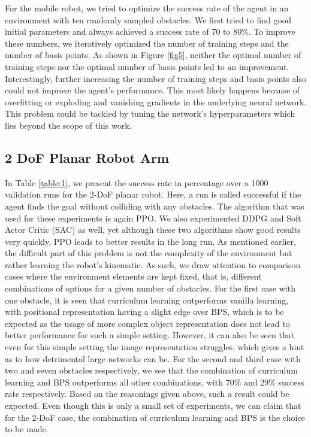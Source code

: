 \documentclass[conference]{IEEEtran}
\begin{document}
For the mobile robot, we tried to optimize the success rate of the agent in an environment with ten randomly sampled obstacles. We first tried to find good initial parameters and always achieved a success rate of 70 to 80\%. To improve these numbers, we iteratively optimized the number of training steps and the number of basis points. As shown in Figure \ref{fig5}, neither the optimal number of training steps nor the optimal number of basis points led to an improvement. Interestingly, further increasing the number of training steps and basis points also could not improve the agent's performance. This most likely happens because of overfitting or exploding and vanishing gradients in the underlying neural network. This problem could be tackled by tuning the network's hyperparameters which lies beyond the scope of this work.

\subsection{2 DoF Planar Robot Arm}

In Table \ref{table:1}, we present the success rate in percentage over a 1000 validation runs for the 2-DoF planar robot. Here, a run is called successful if the agent finds the goal without colliding with any obstacles. The algorithm that was used for these experiments is again PPO. We also experimented DDPG and Soft Actor Critic (SAC) as well, yet although these two algorithms show good results very quickly, PPO leads to better results in the long run. As mentioned earlier, the difficult part of this problem is not the complexity of the environment but rather learning the robot's kinematic. As such, we draw attention to comparison cases where the environment elements are kept fixed, that is, different combinations of options for a given number of obstacles. 
For the first case with one obstacle, it is seen that curriculum learning outperforms vanilla learning, with positional representation having a slight edge over BPS, which is to be expected as the usage of more complex object representation does not lead to better performance for such a simple setting. However, it can also be seen that even for this simple setting the image representation struggles, which gives a hint as to how detrimental large networks can be. 
For the second and third case with two and seven obstacles respectively, we see that the combination of curriculum learning and BPS outperforms all other combinations, with 70\% and 29\% success rate respectively. Based on the reasonings given above, such a result could be expected. Even though this is only a small set of experiments, we can claim that for the 2-DoF case, the combination of curriculum learning and BPS is the choice to be made. 
\end{document}
